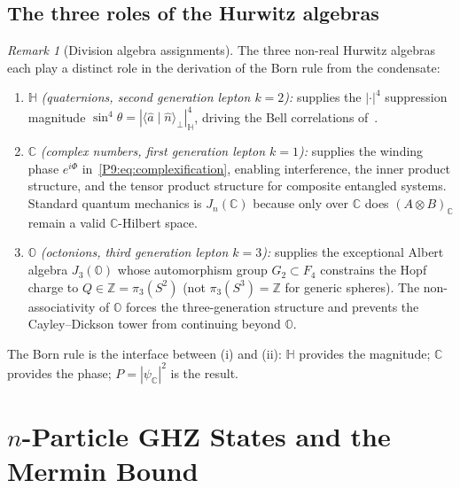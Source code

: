 \documentclass[11pt,a4paper]{article}
\theoremstyle{definition}
\theoremstyle{remark}
\newtheorem{remark}[theorem]{Remark}
\newcommand{\CC}{\mathbb{C}}
\newcommand{\HH}{\mathbb{H}}
\newcommand{\OO}{\mathbb{O}}
\newcommand{\ZZ}{\mathbb{Z}}
\begin{document}
\subsection{The three roles of the Hurwitz algebras}
 
\begin{remark}[Division algebra assignments]
\label{P9:rem:hurwitz_roles}
The three non-real Hurwitz algebras each play a distinct role in the
derivation of the Born rule from the condensate:
\begin{enumerate}[label=(\roman*)]
  \item $\HH$ \emph{(quaternions, second generation lepton $k=2$):}
    supplies the $|\cdot|^4$ suppression magnitude
    $\sin^4\theta = |\langle\hat{a}\mid\hat{n}\rangle_\perp|_\HH^4$,
    driving the Bell correlations of~\cite{Paper8}.
 
  \item $\CC$ \emph{(complex numbers, first generation lepton $k=1$):}
    supplies the winding phase $e^{i\Phi}$ in~\eqref{P9:eq:complexification},
    enabling interference, the inner product structure, and the tensor
    product structure for composite entangled systems.
    Standard quantum mechanics is $J_n(\CC)$ because only over $\CC$
    does $(A\otimes B)_\CC$ remain a valid $\CC$-Hilbert space.
 
  \item $\OO$ \emph{(octonions, third generation lepton $k=3$):}
    supplies the exceptional Albert algebra $J_3(\OO)$ whose automorphism
    group $G_2\subset F_4$ constrains the Hopf charge to
    $Q\in\ZZ = \pi_3(S^2)$ (not $\pi_3(S^3)=\ZZ$ for generic spheres).
    The non-associativity of $\OO$ forces the three-generation structure
    and prevents the Cayley--Dickson tower from continuing beyond $\OO$.
\end{enumerate}
The Born rule is the interface between (i) and (ii): $\HH$ provides the
magnitude; $\CC$ provides the phase; $P=|\psi_\CC|^2$ is the result.
\end{remark}
 
\section{$n$-Particle GHZ States and the Mermin Bound}
\label{P9:sec:GHZ}
 
\end{document}
